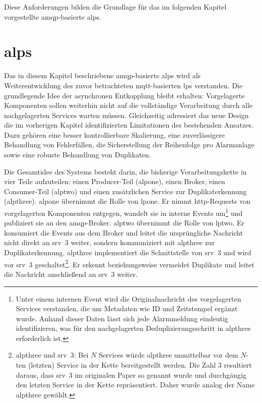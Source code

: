 Diese Anforderungen bilden die Grundlage für das im folgenden Kapitel vorgestellte \gls{amqp}-basierte \gls{alps}.

\chapter{\acrfull{alps}}
\label{ch:amqp-proxy}

Das in diesem Kapitel beschriebene \gls{amqp}-basierte \gls{alps} wird als Weiterentwicklung des zuvor betrachteten \gls{mqtt}-basierten \gls{lps} verstanden. Die grundlegende Idee der asynchronen Entkopplung bleibt erhalten: Vorgelagerte Komponenten sollen weiterhin nicht auf die vollständige Verarbeitung durch alle nachgelagerten Services warten müssen. Gleichzeitig adressiert das neue Design die im vorherigen Kapitel identifizierten Limitationen des bestehenden Ansatzes. Dazu gehören eine besser kontrollierbare Skalierung, eine zuverlässigere Behandlung von Fehlerfällen, die Sicherstellung der Reihenfolge pro Alarmanlage sowie eine robuste Behandlung von Duplikaten.

Die Gesamtidee des Systems besteht darin, die bisherige Verarbeitungskette in vier Teile aufzuteilen: einen Producer-Teil (\gls{alpone}), einen Broker, einen Consumer-Teil (\gls{alptwo}) und einen zusätzlichen Service zur Duplikaterkennung (\gls{alpthree}). \gls{alpone} übernimmt die Rolle von \gls{lpone}. %
Er nimmt \gls{http}-Requests von vorgelagerten Komponenten entgegen, wandelt sie in interne Events um\footnote{Unter einem internen Event wird die Originalnachricht des vorgelagerten Services verstanden, die um Metadaten wie ID und Zeitstempel ergänzt wurde. Anhand dieser Daten lässt sich jede Alarmmeldung eindeutig identifizieren, was für den nachgelagerten Deduplizierungsschritt in \gls{alpthree} erforderlich ist.} und publiziert sie an den \gls{amqp}-Broker. \gls{alptwo} übernimmt die Rolle von \gls{lptwo}. Er konsumiert die Events aus dem Broker und leitet die ursprüngliche Nachricht nicht direkt an \gls{srv}~3 weiter, sondern kommuniziert mit \gls{alpthree} zur Duplikaterkennung. \gls{alpthree} implementiert die Schnittstelle von \gls{srv}~3 und wird vor \gls{srv}~3 geschaltet\footnote{\gls{alpthree} und \gls{srv}~3: Bei $N$ Services würde \gls{alpthree} unmittelbar vor dem $N$-ten (letzten) Service in der Kette bereitgestellt werden. Die Zahl 3 resultiert daraus, dass \gls{srv}~3 im originalen Paper so genannt wurde und durchgängig den letzten Service in der Kette repräsentiert. Daher wurde analog der Name \gls{alpthree} gewählt.}. Er erkennt beziehungsweise vermeidet Duplikate und leitet die Nachricht anschließend an \gls{srv}~3 weiter.

